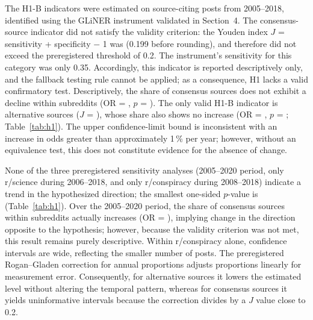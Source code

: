 \documentclass[10pt,a4paper]{article}
\begin{document}
The H1-B indicators were estimated on \resHoneBCiting{} source-citing posts from
2005--2018, identified using the GLiNER instrument validated in Section~4. The
consensus-source indicator did not satisfy the validity criterion: the Youden index
$J$ = sensitivity + specificity $-$ 1 was \resAuditConsensusJ{} (0.199 before rounding),
and therefore did not exceed the preregistered threshold of 0.2.
The instrument's sensitivity for this category was only 0.35.
Accordingly, this indicator is reported descriptively only, and the fallback testing
rule cannot be applied; as a consequence, H1 lacks a valid confirmatory test.
Descriptively, the share of consensus sources does not exhibit a decline within
subreddits (OR = \resHoneBConsensusOr, $p$ = \resHoneBConsensusP). The only valid
H1-B indicator is alternative sources ($J$ = \resAuditAlternativeJ), whose share
also shows no increase (OR = \resHoneBAlternativeOr,
$p$ = \resHoneBAlternativeP; Table~\ref{tab:h1}).
The upper confidence-limit bound is inconsistent with an increase in odds greater
than approximately 1\,\% per year; however, without an equivalence test, this does
not constitute evidence for the absence of change.

None of the three preregistered sensitivity analyses (2005--2020 period, only r/science
during 2006--2018, and only r/conspiracy during 2008--2018) indicate a trend in the
hypothesized direction; the smallest one-sided $p$-value is
\resHoneBConsensusConspiracyP{} (Table~\ref{tab:h1}). Over the 2005--2020 period,
the share of consensus sources within subreddits actually increases
(OR = \resHoneBConsensusTwentyOr), implying change in the direction opposite to the
hypothesis; however, because the validity criterion was not met, this result remains
purely descriptive.
Within r/conspiracy alone, confidence intervals are wide, reflecting the smaller number
of posts.
The preregistered Rogan--Gladen correction for annual proportions adjusts proportions
linearly for measurement error. Consequently, for alternative sources it lowers the
estimated level without altering the temporal pattern, whereas for consensus sources
it yields uninformative intervals because the correction divides by a $J$ value close
to 0.2.
\end{document}
